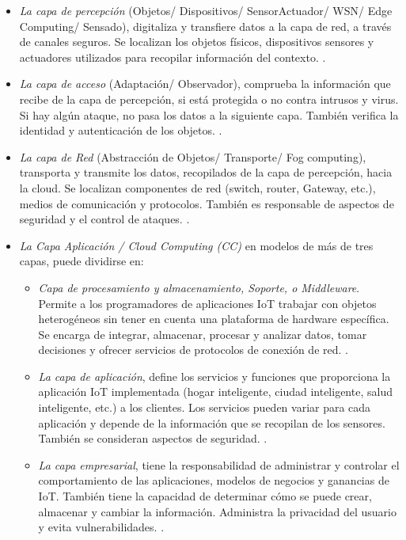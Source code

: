     \begin{itemize}
        \item \textit{La capa de percepción} (Objetos/ Dispositivos/ SensorActuador/ WSN/ Edge Computing/ Sensado), digitaliza y transfiere datos a la capa de red, a través de canales seguros. Se localizan los objetos físicos, dispositivos sensores y actuadores utilizados para recopilar información del contexto. \cite{ref9}.
        \item \textit{La capa de acceso} (Adaptación/ Observador), comprueba la información que recibe de la capa de percepción, si está protegida o no contra intrusos y virus. Si hay algún ataque, no pasa los datos a la siguiente capa. También verifica la identidad y autenticación de los objetos. \cite{ref9} \cite{ref10}.
        \item \textit{La capa de Red} (Abstracción de Objetos/ Transporte/ Fog computing), transporta y transmite los datos, recopilados de la capa de percepción, hacia la cloud. Se localizan componentes de red (switch, router, Gateway, etc.), medios de comunicación y protocolos. También es responsable de aspectos de seguridad y el control de ataques. \cite{ref9} \cite{ref10}.
        \item \textit{La Capa Aplicación / Cloud Computing (CC)} en modelos de más de tres capas, puede dividirse en:
            \begin{itemize}
                \item \textit{Capa de procesamiento y almacenamiento, Soporte, o Middleware}. Permite a los programadores de aplicaciones IoT trabajar con objetos heterogéneos sin tener en cuenta una plataforma de hardware específica. Se encarga de integrar, almacenar, procesar y analizar datos, tomar decisiones y ofrecer servicios de protocolos de conexión de red. \cite{ref9}.
                \item \textit{La capa de aplicación}, define los servicios y funciones que proporciona la aplicación IoT implementada (hogar inteligente, ciudad inteligente, salud inteligente, etc.) a los clientes. Los servicios pueden variar para cada aplicación y depende de la información que se recopilan de los sensores. También se consideran aspectos de seguridad. \cite{ref9} \cite{ref10}.
                \item \textit{La capa empresarial}, tiene la responsabilidad de administrar y controlar el comportamiento de las aplicaciones, modelos de negocios y ganancias de IoT. También tiene la capacidad de determinar cómo se puede crear, almacenar y cambiar la información. Administra la privacidad del usuario y evita vulnerabilidades. \cite{ref9} \cite{ref10}.
            \end{itemize}
    \end{itemize} 

